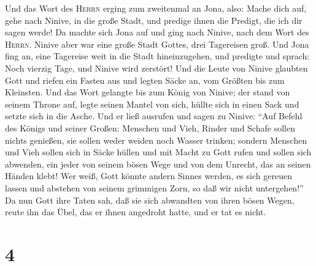  Und das Wort des \textsc{Herrn} erging zum zweitenmal an
Jona, also:  Mache dich auf, gehe nach Ninive, in die
große Stadt, und predige ihnen die Predigt, die ich dir sagen werde!
 Da machte sich Jona auf und ging nach Ninive, nach dem
Wort des \textsc{Herrn}. Ninive aber war eine große Stadt Gottes, drei
Tagereisen groß.  Und Jona fing an, eine Tagereise weit in
die Stadt hineinzugehen, und predigte und sprach: Noch vierzig Tage, und
Ninive wird zerstört!  Und die Leute von Ninive glaubten
Gott und riefen ein Fasten aus und legten Säcke an, vom Größten bis zum
Kleinsten.  Und das Wort gelangte bis zum König von
Ninive; der stand von seinem Throne auf, legte seinen Mantel von sich,
hüllte sich in einen Sack und setzte sich in die Asche. 
Und er ließ ausrufen und sagen zu Ninive: ``Auf Befehl des Königs und
seiner Großen: Menschen und Vieh, Rinder und Schafe sollen nichts
genießen, sie sollen weder weiden noch Wasser trinken; 
sondern Menschen und Vieh sollen sich in Säcke hüllen und mit Macht zu
Gott rufen und sollen sich abwenden, ein jeder von seinem bösen Wege und
von dem Unrecht, das an seinen Händen klebt!  Wer weiß,
Gott könnte andern Sinnes werden, es sich gereuen lassen und abstehen
von seinem grimmigen Zorn, so daß wir nicht untergehen!''
 Da nun Gott ihre Taten sah, daß sie sich abwandten von
ihren bösen Wegen, reute ihn das Übel, das er ihnen angedroht hatte, und
er tat es nicht.

\hypertarget{section-3}{%
\section{4}\label{section-3}}

